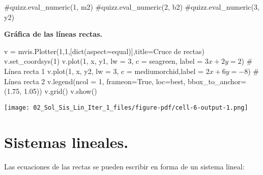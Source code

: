 \documentclass[
  letterpaper,
  DIV=11,
  numbers=noendperiod]{scrreprt}
\newenvironment{Shaded}{\begin{snugshade}}{\end{snugshade}}
\newcommand{\BuiltInTok}[1]{\textcolor[rgb]{0.00,0.23,0.31}{#1}}
\newcommand{\CommentTok}[1]{\textcolor[rgb]{0.37,0.37,0.37}{#1}}
\newcommand{\DecValTok}[1]{\textcolor[rgb]{0.68,0.00,0.00}{#1}}
\newcommand{\FloatTok}[1]{\textcolor[rgb]{0.68,0.00,0.00}{#1}}
\newcommand{\NormalTok}[1]{\textcolor[rgb]{0.00,0.23,0.31}{#1}}
\newcommand{\OperatorTok}[1]{\textcolor[rgb]{0.37,0.37,0.37}{#1}}
\newcommand{\StringTok}[1]{\textcolor[rgb]{0.13,0.47,0.30}{#1}}
\newcommand{\VariableTok}[1]{\textcolor[rgb]{0.07,0.07,0.07}{#1}}
\begin{document}
\begin{Shaded}
\begin{Highlighting}[]
\CommentTok{\#quizz.eval\_numeric(\textquotesingle{}1\textquotesingle{}, m2)}
\CommentTok{\#quizz.eval\_numeric(\textquotesingle{}2\textquotesingle{}, b2)}
\CommentTok{\#quizz.eval\_numeric(\textquotesingle{}3\textquotesingle{}, y2)}
\end{Highlighting}
\end{Shaded}

\textbf{Gráfica de las líneas rectas.}

\begin{Shaded}
\begin{Highlighting}[]
\NormalTok{v }\OperatorTok{=}\NormalTok{ mvis.Plotter(}\DecValTok{1}\NormalTok{,}\DecValTok{1}\NormalTok{,[}\BuiltInTok{dict}\NormalTok{(aspect}\OperatorTok{=}\StringTok{\textquotesingle{}equal\textquotesingle{}}\NormalTok{)],title}\OperatorTok{=}\StringTok{\textquotesingle{}Cruce de rectas\textquotesingle{}}\NormalTok{) }
\NormalTok{v.set\_coordsys(}\DecValTok{1}\NormalTok{)}
\NormalTok{v.plot(}\DecValTok{1}\NormalTok{, x, y1, lw }\OperatorTok{=} \DecValTok{3}\NormalTok{, c }\OperatorTok{=} \StringTok{\textquotesingle{}seagreen\textquotesingle{}}\NormalTok{, label }\OperatorTok{=} \StringTok{\textquotesingle{}$3x+2y=2$\textquotesingle{}}\NormalTok{) }\CommentTok{\# Línea recta 1}
\NormalTok{v.plot(}\DecValTok{1}\NormalTok{, x, y2, lw }\OperatorTok{=} \DecValTok{3}\NormalTok{, c }\OperatorTok{=} \StringTok{\textquotesingle{}mediumorchid\textquotesingle{}}\NormalTok{,label }\OperatorTok{=} \StringTok{\textquotesingle{}$2x+6y={-}8$\textquotesingle{}}\NormalTok{) }\CommentTok{\# Línea recta 2}
\NormalTok{v.legend(ncol }\OperatorTok{=} \DecValTok{1}\NormalTok{, frameon}\OperatorTok{=}\VariableTok{True}\NormalTok{, loc}\OperatorTok{=}\StringTok{\textquotesingle{}best\textquotesingle{}}\NormalTok{, bbox\_to\_anchor}\OperatorTok{=}\NormalTok{(}\FloatTok{1.75}\NormalTok{, }\FloatTok{1.05}\NormalTok{))}
\NormalTok{v.grid()}
\NormalTok{v.show()}
\end{Highlighting}
\end{Shaded}

\texttt{[image: 02\_Sol\_Sis\_Lin\_Iter\_1\_files/figure-pdf/cell-6-output-1.png]}

\section{Sistemas lineales.}\label{sistemas-lineales.}

Las ecuaciones de las rectas se pueden escribir en forma de un sistema
lineal:
\end{document}
